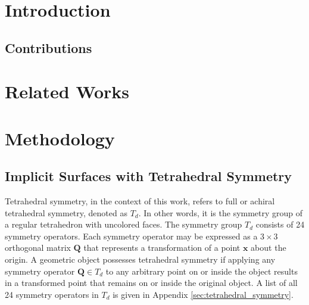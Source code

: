 \documentclass[acmtog]{acmart}
\begin{document}



\maketitle

\section{Introduction}

\subsection{Contributions}

\section{Related Works}

\section{Methodology}

\subsection{Implicit Surfaces with Tetrahedral Symmetry}
\label{sec:implicit_surface_tetrahedral_symmetry}

Tetrahedral symmetry, in the context of this work, refers to full or achiral tetrahedral symmetry, denoted as $T_d$. In other words, it is the symmetry group of a regular tetrahedron with uncolored faces. The symmetry group $T_d$ consists of 24 symmetry operators. Each symmetry operator may be expressed as a $3\times3$ orthogonal matrix $\mathbf{Q}$ that represents a transformation of a point $\mathbf{x}$ about the origin. A geometric object possesses tetrahedral symmetry if applying any symmetry operator $\mathbf{Q} \in T_d$ to any arbitrary point on or inside the object results in a transformed point that remains on or inside the original object. A list of all 24 symmetry operators in $T_d$ is given in Appendix \ref{sec:tetrahedral_symmetry}.
\end{document}
